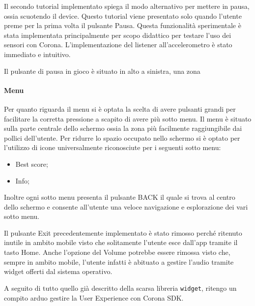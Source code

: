 			Il secondo tutorial implementato spiega il modo alternativo per mettere in pausa, ossia scuotendo il device. Questo tutorial viene presentato solo quando l'utente preme per la prima volta il pulsante Pausa. Questa funzionalità sperimentale è stata implementata principalmente per scopo didattico per testare l'uso dei sensori con Corona. L'implementazione del listener all'accelerometro è stato immediato e intuitivo.
		
		
		
		Il pulsante di pausa in gioco è situato in alto a sinistra, una zona
	
		\paragraph{Menu} Per quanto riguarda il menu si è optata la scelta di avere pulsanti grandi per facilitare la corretta pressione a scapito di avere più sotto menu. Il menu è situato sulla parte centrale dello schermo ossia la zona più facilmente raggiungibile dai pollici dell'utente. Per ridurre lo spazio occupato nello schermo si è optato per l'utilizzo di icone universalmente riconosciute per i seguenti sotto menu:
		\begin{itemize}
			\item Best score;
			\item Info;
		\end{itemize}
		Inoltre ogni sotto menu presenta il pulsante BACK il quale si trova al centro dello schermo e consente all'utente una veloce navigazione e esplorazione dei vari sotto menu.
		
		Il pulsante Exit precedentemente implementato è stato rimosso perché ritenuto inutile in ambito mobile visto che solitamente l'utente esce dall'app tramite il tasto Home. Anche l'opzione del Volume potrebbe essere rimossa visto che, sempre in ambito mobile, l'utente infatti è abituato a gestire l'audio tramite widget offerti dal sistema operativo.
		
		A seguito di tutto quello già descritto della scarsa libreria \verb|widget|, ritengo un compito arduo gestire la User Experience con Corona SDK.
	
		
